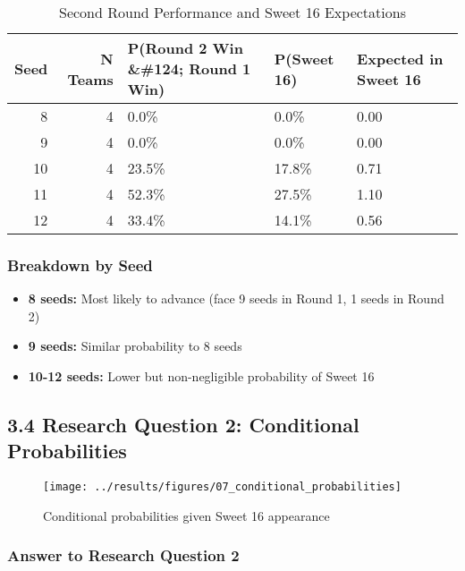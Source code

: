 \documentclass[
]{article}
\providecommand{\tightlist}{%
  \setlength{\itemsep}{0pt}\setlength{\parskip}{0pt}}
\begin{document}
\begin{longtable}[t]{rrlll}
\caption{\label{tab:advancement-table}Second Round Performance and Sweet 16 Expectations}\\
\toprule
Seed & N Teams & P(Round 2 Win \&\#124; Round 1 Win) & P(Sweet 16) & Expected in Sweet 16\\
\midrule
8 & 4 & 0.0\% & 0.0\% & 0.00\\
9 & 4 & 0.0\% & 0.0\% & 0.00\\
10 & 4 & 23.5\% & 17.8\% & 0.71\\
11 & 4 & 52.3\% & 27.5\% & 1.10\\
12 & 4 & 33.4\% & 14.1\% & 0.56\\
\bottomrule
\end{longtable}

\subsubsection{Breakdown by Seed}\label{breakdown-by-seed}

\begin{itemize}
\tightlist
\item
  \textbf{8 seeds:} Most likely to advance (face 9 seeds in Round 1, 1
  seeds in Round 2)
\item
  \textbf{9 seeds:} Similar probability to 8 seeds
\item
  \textbf{10-12 seeds:} Lower but non-negligible probability of Sweet 16
\end{itemize}

\subsection{3.4 Research Question 2: Conditional
Probabilities}\label{research-question-2-conditional-probabilities}

\begin{figure}

{\centering \texttt{[image: ../results/figures/07\_conditional\_probabilities]} 

}

\caption{Conditional probabilities given Sweet 16 appearance}\label{fig:conditional-plot}
\end{figure}

\subsubsection{Answer to Research Question
2}\label{answer-to-research-question-2}
\end{document}

